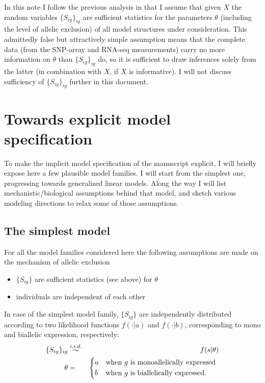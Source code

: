 \documentclass{article}
\begin{document}
In this note I follow the previous analysis in that I assume that given $X$ the random variables
$\{S_{ig}\}_{ig}$ are sufficient statistics for the parameters $\theta$ (including the level of
allelic exclusion) of all model structures under consideration.  This admittedly false but
attractively simple assumption means that the complete data (from the SNP-array and RNA-seq
measurements) carry no more information on $\theta$ than $\{S_{ig}\}_{ig}$ do, so it is sufficient
to draw inferences solely from the latter (in combination with $X$, if $X$ is informative).  I will
not discuss sufficiency of $\{S_{ig}\}_{ig}$ further in this document.

\section{Towards explicit model specification}

To make the implicit model specification of the manuscript explicit, I will briefly expose here a
few plausible model families.  I will start from the simplest one, progressing towards generalized
linear models.  Along the way I will list mechanistic/biological assumptions behind that model, and
sketch various modeling directions to relax some of those assumptions.

\subsection{The simplest model}

For all the model families considered here the following assumptions are made
on the mechanism of allelic exclusion
\begin{itemize}
\item $\{S_{ig}\}$ are sufficient statistics (see above) for $\theta$
\item individuals are independent of each other
\end{itemize}

In case of the simplest model family, $\{S_{ig}\}$ are independently
distributed according to two likelihood functions $f(\cdot|a)$ and
$f(\cdot|b)$, corresponding to mono and biallelic expression, respectively:
\begin{eqnarray}
\label{eq:two-level}
\{S_{ig}\}_{ig} &\overset{i.i.d.}{\sim}& f(s | \theta) \\
\label{eq:two-level-cases}
\theta &=&
\begin{dcases*}
a & when $g$ is monoallelically expressed \\
b & when $g$ is biallelically expressed.
\end{dcases*}
\end{eqnarray}
\end{document}
